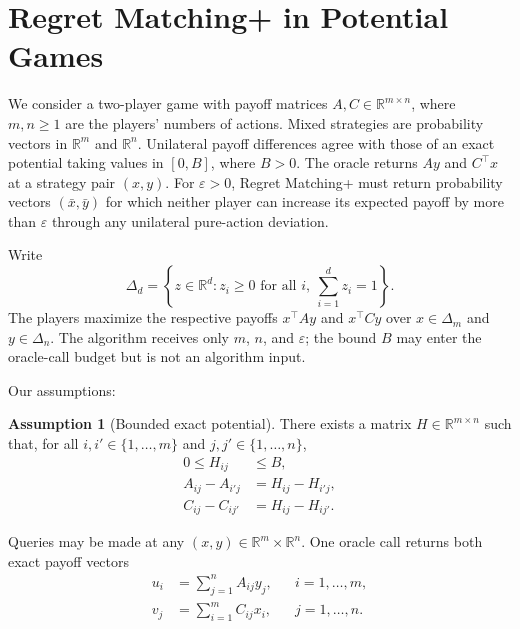 \documentclass[10pt]{article}
\theoremstyle{definition}
\newtheorem{assumption}{Assumption}
\begin{document}
\section*{Regret Matching+ in Potential Games}
We consider a two-player game with payoff matrices $A,C\in\mathbb{R}^{m\times n}$, where $m,n\geq 1$ are the players' numbers of actions. Mixed strategies are probability vectors in $\mathbb{R}^m$ and $\mathbb{R}^n$. Unilateral payoff differences agree with those of an exact potential taking values in $[0,B]$, where $B>0$. The oracle returns $Ay$ and $C^\top x$ at a strategy pair $(x,y)$. For $\varepsilon>0$, Regret Matching+ must return probability vectors $(\bar{x},\bar{y})$ for which neither player can increase its expected payoff by more than $\varepsilon$ through any unilateral pure-action deviation.

Write
\[
\Delta_d=\left\{z\in\mathbb{R}^d:z_i\geq 0\text{ for all }i,\ \sum_{i=1}^d z_i=1\right\}.
\]
The players maximize the respective payoffs $x^\top Ay$ and $x^\top Cy$ over $x\in\Delta_m$ and $y\in\Delta_n$. The algorithm receives only $m$, $n$, and $\varepsilon$; the bound $B$ may enter the oracle-call budget but is not an algorithm input.

Our assumptions:
\begin{assumption}[Bounded exact potential]
There exists a matrix $H\in\mathbb{R}^{m\times n}$ such that, for all $i,i'\in\{1,\ldots,m\}$ and $j,j'\in\{1,\ldots,n\}$,
\[
\begin{aligned}
0\leq H_{ij}&\leq B,\\
A_{ij}-A_{i'j}&=H_{ij}-H_{i'j},\\
C_{ij}-C_{ij'}&=H_{ij}-H_{ij'}.
\end{aligned}
\]
\end{assumption}

Queries may be made at any $(x,y)\in\mathbb{R}^m\times\mathbb{R}^n$. One oracle call returns both exact payoff vectors
\[
\begin{aligned}
u_i&=\sum_{j=1}^n A_{ij}y_j, &&i=1,\ldots,m,\\
v_j&=\sum_{i=1}^m C_{ij}x_i, &&j=1,\ldots,n.
\end{aligned}
\]
\end{document}
